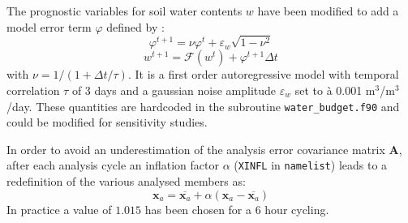 \documentclass[12pt]{article}
\begin{document}
The prognostic variables for soil water contents $w$ have been modified to
add a model error term $\varphi$ defined by :
\[
\varphi^{t+1}= \nu \varphi^{t} + \varepsilon_w\sqrt{1-\nu^2}
\]
\[
w^{t+1} = \mathcal{F}(w^{t}) + \varphi^{t+1} \Delta t
\]
with $\nu=1/(1+\Delta t/\tau)$. 
It is a first order autoregressive model with temporal correlation $\tau$ of 3 days
and  a gaussian noise amplitude $\varepsilon_w$
set to  \`a 0.001 m$^3$/m$^3$/day. These quantities are hardcoded in the
subroutine {\tt water\_budget.f90} and could be modified for sensitivity studies.
\par
In order to avoid an underestimation of the analysis error covariance matrix $\mathbf{A}$,
after each analysis cycle an inflation factor $\alpha$ ({\tt XINFL} in {\tt namelist})
leads to a redefinition of the various analysed members as:
\[
\mathbf{x}_a = \overline{\mathbf{x}_a} + \alpha(\mathbf{x}_a - \overline{\mathbf{x}_a})
\]
In practice a value of $1.015$ has been chosen for a 6 hour cycling.
\end{document}
